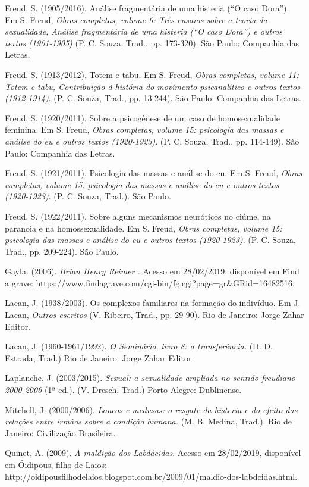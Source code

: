 Freud, S. (1905/2016). Análise fragmentária de uma histeria (``O caso
Dora''). Em S. Freud, \emph{Obras completas, volume 6: Três ensaios
sobre a teoria da sexualidade, Análise fragmentária de uma histeria (``O
caso Dora'') e outros textos (1901-1905)} (P. C. Souza, Trad., pp.
173-320). São Paulo: Companhia das Letras.

Freud, S. (1913/2012). Totem e tabu. Em S. Freud, \emph{Obras completas,
volume 11: Totem e tabu, Contribuição à história do movimento
psicanalítico e outros textos (1912-1914)}. (P. C. Souza, Trad., pp.
13-244). São Paulo: Companhia das Letras.

Freud, S. (1920/2011). Sobre a psicogênese de um caso de homosexualidade
feminina. Em S. Freud, \emph{Obras completas, volume 15: psicologia das
massas e análise do eu e outros textos (1920-1923)}. (P. C. Souza,
Trad., pp. 114-149). São Paulo: Companhia das Letras.

Freud, S. (1921/2011). Psicologia das massas e análise do eu. Em S.
Freud, \emph{Obras completas, volume 15: psicologia das massas e análise
do eu e outros textos (1920-1923)}. (P. C. Souza, Trad.). São Paulo.

Freud, S. (1922/2011). Sobre alguns mecanismos neuróticos no ciúme, na
paranoia e na homossexualidade. Em S. Freud, \emph{Obras completas,
volume 15: psicologia das massas e análise do eu e outros textos
(1920-1923)}. (P. C. Souza, Trad., pp. 209-224). São Paulo.

Gayla. (2006). \emph{Brian Henry Reimer .} Acesso em 28/02/2019,
disponível em Find a grave:
https://www.findagrave.com/cgi-bin/fg.cgi?page=gr\&GRid=16482516.

Lacan, J. (1938/2003). Os complexos familiares na formação do indivíduo.
Em J. Lacan, \emph{Outros escritos} (V. Ribeiro, Trad., pp. 29-90). Rio
de Janeiro: Jorge Zahar Editor.

Lacan, J. (1960-1961/1992). \emph{O Seminário, livro 8: a
transferência.} (D. D. Estrada, Trad.) Rio de Janeiro: Jorge Zahar
Editor.

Laplanche, J. (2003/2015). \emph{Sexual: a sexualidade ampliada no
sentido freudiano 2000-2006} (1ª ed.). (V. Dresch, Trad.) Porto Alegre:
Dublinense.

Mitchell, J. (2000/2006). \emph{Loucos e medusas: o resgate da histeria
e do efeito das relações entre irmãos sobre a condição humana.} (M. B.
Medina, Trad.). Rio de Janeiro: Civilização Brasileira.

Quinet, A. (2009). \emph{A maldição dos Labdácidas}. Acesso em
28/02/2019, disponível em Óidipous, filho de Laios:
http://oidipousfilhodelaios.blogspot.com.br/2009/01/maldio-dos-labdcidas.html.

